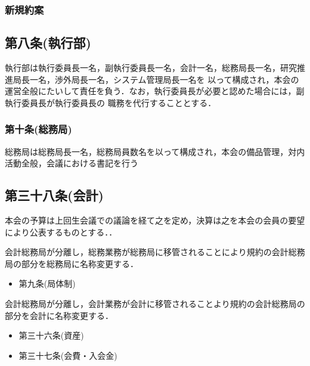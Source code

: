 \subsubsection*{新規約案}
\subsection*{第八条(執行部)}
執行部は執行委員長一名，副執行委員長一名，会計一名，総務局長一名，研究推進局長一名，渉外局長一名，システム管理局長一名を
以って構成され，本会の運営全般にたいして責任を負う．なお，執行委員長が必要と認めた場合には，副執行委員長が執行委員長の
職務を代行することとする．

\subsubsection*{第十条(総務局)}
総務局は総務局長一名，総務局員数名を以って構成され，本会の備品管理，対内活動全般，会議における書記を行う

\subsection*{第三十八条(会計)}
本会の予算は上回生会議での議論を経て之を定め，決算は之を本会の会員の要望により公表するものとする．．

会計総務局が分離し，総務業務が総務局に移管されることにより規約の会計総務局の部分を総務局に名称変更する．
\begin{itemize}
\item 第九条(局体制)
\end{itemize}

会計総務局が分離し，会計業務が会計に移管されることより規約の会計総務局の部分を会計に名称変更する．
\begin{itemize}
\item 第三十六条(資産)
\item 第三十七条(会費・入会金)
\end{itemize}
